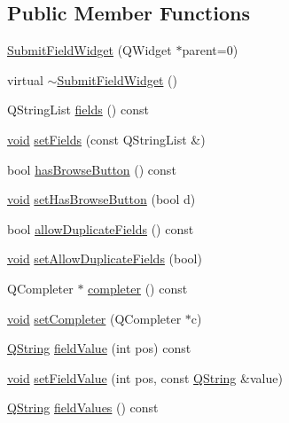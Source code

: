 \subsection*{\-Public \-Member \-Functions}
\begin{DoxyCompactItemize}
\item 
\hyperlink{class_utils_1_1_submit_field_widget_a5c94b205b129aa2e13380f50613c1219}{\-Submit\-Field\-Widget} (\-Q\-Widget $\ast$parent=0)
\item 
virtual \hyperlink{class_utils_1_1_submit_field_widget_a70d97293a17e22f06a730e18b95518e0}{$\sim$\-Submit\-Field\-Widget} ()
\item 
\-Q\-String\-List \hyperlink{class_utils_1_1_submit_field_widget_a1d6fd4fe2919c099e5cb7e4a85e4b3af}{fields} () const 
\item 
\hyperlink{group___u_a_v_objects_plugin_ga444cf2ff3f0ecbe028adce838d373f5c}{void} \hyperlink{class_utils_1_1_submit_field_widget_a5cc81b5b6aca524b7e3668c519719ee1}{set\-Fields} (const \-Q\-String\-List \&)
\item 
bool \hyperlink{class_utils_1_1_submit_field_widget_af634ec674af941e50bfb46ef816aa251}{has\-Browse\-Button} () const 
\item 
\hyperlink{group___u_a_v_objects_plugin_ga444cf2ff3f0ecbe028adce838d373f5c}{void} \hyperlink{class_utils_1_1_submit_field_widget_a5b332d77afb3bb77d57a744805dd02b1}{set\-Has\-Browse\-Button} (bool d)
\item 
bool \hyperlink{class_utils_1_1_submit_field_widget_ac3e509c0a1f442d378434953b365e707}{allow\-Duplicate\-Fields} () const 
\item 
\hyperlink{group___u_a_v_objects_plugin_ga444cf2ff3f0ecbe028adce838d373f5c}{void} \hyperlink{class_utils_1_1_submit_field_widget_a8cc8d00f25687d8fc526bb66ddde5620}{set\-Allow\-Duplicate\-Fields} (bool)
\item 
\-Q\-Completer $\ast$ \hyperlink{class_utils_1_1_submit_field_widget_ab11b596a4e9e831bb1090febdf0e1324}{completer} () const 
\item 
\hyperlink{group___u_a_v_objects_plugin_ga444cf2ff3f0ecbe028adce838d373f5c}{void} \hyperlink{class_utils_1_1_submit_field_widget_ac40d3d639f21ed3f2c1a364578529b11}{set\-Completer} (\-Q\-Completer $\ast$c)
\item 
\hyperlink{group___u_a_v_objects_plugin_gab9d252f49c333c94a72f97ce3105a32d}{\-Q\-String} \hyperlink{class_utils_1_1_submit_field_widget_a9085ebdc78107f7973721f890706dfd1}{field\-Value} (int pos) const 
\item 
\hyperlink{group___u_a_v_objects_plugin_ga444cf2ff3f0ecbe028adce838d373f5c}{void} \hyperlink{class_utils_1_1_submit_field_widget_afad7e57d164b4398e7d0b4783c93a543}{set\-Field\-Value} (int pos, const \hyperlink{group___u_a_v_objects_plugin_gab9d252f49c333c94a72f97ce3105a32d}{\-Q\-String} \&value)
\item 
\hyperlink{group___u_a_v_objects_plugin_gab9d252f49c333c94a72f97ce3105a32d}{\-Q\-String} \hyperlink{class_utils_1_1_submit_field_widget_a7008903646d9ebac6e100dbc5434c55e}{field\-Values} () const 
\end{DoxyCompactItemize}
